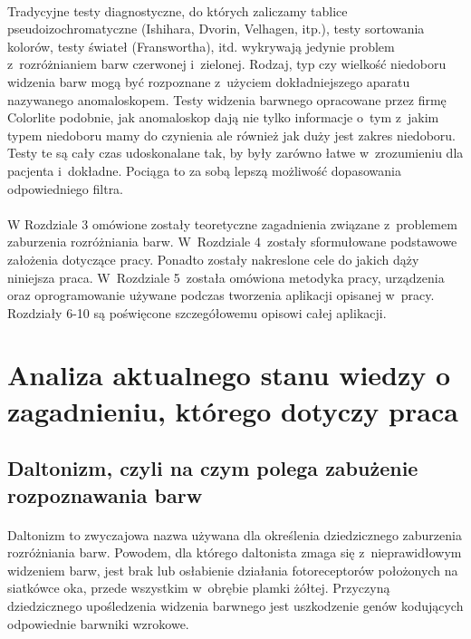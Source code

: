 \documentclass[12pt, letterpaper]{article}
\begin{document}
\paragraph{}
Tradycyjne testy diagnostyczne, do których zaliczamy tablice pseudoizochromatyczne (Ishihara, Dvorin, Velhagen, itp.), testy sortowania kolorów, testy świateł (Franswortha), itd. wykrywają jedynie problem z~rozróżnianiem barw czerwonej i~zielonej. Rodzaj, typ czy wielkość niedoboru widzenia barw mogą być rozpoznane z~użyciem dokładniejszego aparatu nazywanego anomaloskopem. Testy widzenia barwnego opracowane przez firmę Colorlite podobnie, jak anomaloskop dają nie tylko informacje o~tym z~jakim typem niedoboru mamy do czynienia ale również jak duży jest zakres niedoboru. Testy te są cały czas udoskonalane tak, by były zarówno łatwe w~zrozumieniu dla pacjenta i~dokładne. Pociąga to za sobą lepszą możliwość dopasowania odpowiedniego filtra.

\paragraph{}
W Rozdziale 3 omówione zostały teoretyczne zagadnienia związane z~problemem zaburzenia rozróżniania barw. W~Rozdziale 4~zostały sformułowane podstawowe założenia dotyczące pracy. Ponadto zostały nakreslone cele do jakich dąży niniejsza praca. W~Rozdziale 5~została omówiona metodyka pracy, urządzenia oraz oprogramowanie używane podczas tworzenia aplikacji opisanej w~pracy. Rozdziały 6-10 są poświęcone szczegółowemu opisowi całej aplikacji.

\newpage
\section{Analiza aktualnego stanu wiedzy o zagadnieniu, którego dotyczy praca}
\subsection{Daltonizm, czyli na czym polega zabużenie rozpoznawania barw}
\paragraph{}
Daltonizm to zwyczajowa nazwa używana dla określenia dziedzicznego zaburzenia rozróżniania barw. Powodem, dla którego daltonista zmaga się z~nieprawidłowym widzeniem barw, jest brak lub osłabienie działania fotoreceptorów położonych na siatkówce oka, przede wszystkim w~obrębie plamki żółtej. Przyczyną dziedzicznego upośledzenia widzenia barwnego jest uszkodzenie genów kodujących odpowiednie barwniki wzrokowe.
\end{document}
